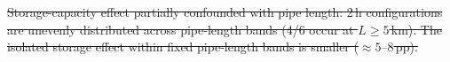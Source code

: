 \documentclass[a4paper,fleqn]{cas-sc} %
\providecommand{\DIFadd}[1]{{\protect\color{blue}\uwave{#1}}} %
\providecommand{\DIFdel}[1]{{\protect\color{red}\sout{#1}}} %
\providecommand{\DIFaddFL}[1]{\DIFadd{#1}} %
\providecommand{\DIFdelFL}[1]{\DIFdel{#1}} %
\providecommand{\DIFaddbeginFL}{} %
\providecommand{\DIFaddendFL}{} %
\providecommand{\DIFdelbeginFL}{} %
\providecommand{\DIFdelendFL}{} %
\begin{document}
\DIFdelFL{Storage-capacity effect partially confounded with
    pipe length: 2\,h configurations are unevenly distributed
    across pipe-length bands (4/6 occur at $L \geq 5$\,km).
    The isolated storage effect within fixed pipe-length bands
    is smaller (${\approx}5$}\DIFdelendFL \DIFaddbeginFL \DIFaddFL{$0.15$}\DIFaddendFL --\DIFdelbeginFL \DIFdelFL{$8$\,pp).
}%
\end{document}
